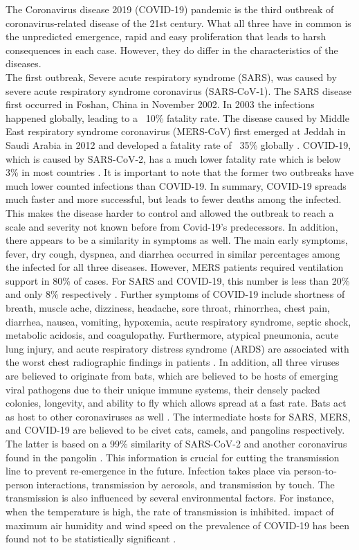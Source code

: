 The Coronavirus disease 2019 (COVID-19) pandemic is the third outbreak of coronavirus-related disease of the 21st century. What all three have in common is the unpredicted emergence, rapid and easy proliferation that leads to harsh consequences in each case. However, they do differ in the characteristics of the diseases.\\
The first outbreak, Severe acute respiratory syndrome (SARS), was caused by severe acute respiratory syndrome coronavirus (SARS-CoV-1). The SARS disease first occurred in Foshan, China in November 2002. In 2003 the infections happened globally, leading to a ~10\% fatality rate.
The disease caused by Middle East respiratory syndrome coronavirus (MERS-CoV) first emerged at Jeddah in Saudi Arabia in 2012 and developed a fatality rate of ~35\% globally \cite{Kirtipal_2020}. 
COVID-19, which is caused by SARS-CoV-2, has a much lower fatality rate which is below 3\% in most countries \cite{Mathieu2021, Yi_2020}. It is important to note that the former two outbreaks have much lower counted infections than COVID-19. In summary, COVID-19 spreads much faster and more successful, but leads to fewer deaths among the infected. This makes the disease harder to control and allowed the outbreak to reach a scale and severity not known before from Covid-19's predecessors. 
In addition, there appears to be a similarity in symptoms as well. The main early symptoms, fever, dry cough, dyspnea, and diarrhea occurred in similar percentages among the infected for all three diseases. However, MERS patients required ventilation support in 80\%  of cases. For SARS and COVID-19, this number is less than 20\% and only 8\% respectively \cite{Yi_2020}.
Further symptoms of COVID-19 include shortness of breath, muscle ache, dizziness, headache, sore throat, rhinorrhea, chest pain, diarrhea, nausea, vomiting, hypoxemia, acute respiratory syndrome, septic shock, metabolic acidosis, and coagulopathy. 
Furthermore, atypical pneumonia, acute lung injury, and acute respiratory distress syndrome (ARDS) are associated with the worst chest radiographic findings in patients \cite{Yi_2020}.
In addition, all three viruses are believed to originate from bats, which are believed to be hosts of emerging viral pathogens due to their unique immune systems, their densely packed colonies, longevity, and ability to fly which allows spread at a fast rate. Bats act as host to other coronaviruses as well \cite{Kirtipal_2020}.
The intermediate hosts for SARS, MERS, and COVID-19 are believed to be civet cats, camels, and pangolins respectively. The latter is based on a 99\% similarity of SARS-CoV-2 and another coronavirus found in the pangolin \cite{Yi_2020}. This information is crucial for cutting the transmission line to prevent re-emergence in the future. 
Infection takes place via person‐to‐person interactions, transmission by aerosols, and transmission by touch. The transmission is also influenced by several environmental factors. For instance, when the temperature is high, the rate of transmission is inhibited. impact of maximum air humidity and wind speed on the prevalence of COVID‐19 has been found not to be statistically significant \cite{Sreekanth_Reddy_2020}. \\

